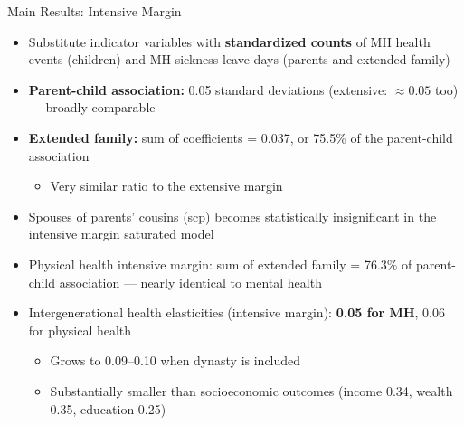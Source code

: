 \documentclass[aspectratio=169]{beamer}
\begin{document}
\begin{frame}{Main Results: Intensive Margin}
  \begin{itemize}
    \item Substitute indicator variables with \textbf{standardized counts} of MH health events (children) and MH sickness leave days (parents and extended family)
    \item \textbf{Parent-child association:} 0.05 standard deviations (extensive: $\approx 0.05$ too) --- broadly comparable
    \item \textbf{Extended family:} sum of coefficients = 0.037, or 75.5\% of the parent-child association
    \begin{itemize}
      \item Very similar ratio to the extensive margin
    \end{itemize}
    \item Spouses of parents' cousins (scp) becomes statistically insignificant in the intensive margin saturated model
    \item Physical health intensive margin: sum of extended family = 76.3\% of parent-child association --- nearly identical to mental health
    \item Intergenerational health elasticities (intensive margin): \textbf{0.05 for MH}, 0.06 for physical health
    \begin{itemize}
      \item Grows to 0.09--0.10 when dynasty is included
      \item Substantially smaller than socioeconomic outcomes (income 0.34, wealth 0.35, education 0.25)
    \end{itemize}
  \end{itemize}
\end{frame}
\end{document}
